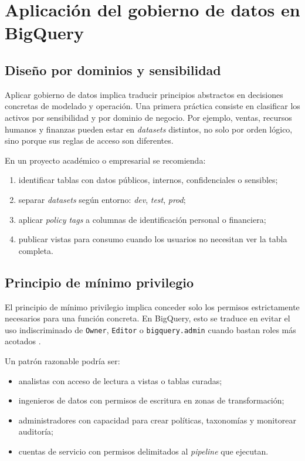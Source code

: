 \documentclass[12pt]{article}
\begin{document}
\section{Aplicación del gobierno de datos en BigQuery}
\subsection{Diseño por dominios y sensibilidad}
Aplicar gobierno de datos implica traducir principios abstractos en decisiones concretas de modelado y operación. Una primera práctica consiste en clasificar los activos por sensibilidad y por dominio de negocio. Por ejemplo, ventas, recursos humanos y finanzas pueden estar en \textit{datasets} distintos, no solo por orden lógico, sino porque sus reglas de acceso son diferentes.

En un proyecto académico o empresarial se recomienda:

\begin{enumerate}[label=\textbf{D\arabic*.}, leftmargin=*]
\item identificar tablas con datos públicos, internos, confidenciales o sensibles;
\item separar \textit{datasets} según entorno: \textit{dev}, \textit{test}, \textit{prod};
\item aplicar \textit{policy tags} a columnas de identificación personal o financiera;
\item publicar vistas para consumo cuando los usuarios no necesitan ver la tabla completa.
\end{enumerate}

\subsection{Principio de mínimo privilegio}
El principio de mínimo privilegio implica conceder solo los permisos estrictamente necesarios para una función concreta. En BigQuery, esto se traduce en evitar el uso indiscriminado de \texttt{Owner}, \texttt{Editor} o \texttt{bigquery.admin} cuando bastan roles más acotados \cite{gcp_bigquery_basic_roles,gcp_bigquery_iam}.

Un patrón razonable podría ser:

\begin{itemize}[leftmargin=*]
\item analistas con acceso de lectura a vistas o tablas curadas;
\item ingenieros de datos con permisos de escritura en zonas de transformación;
\item administradores con capacidad para crear políticas, taxonomías y monitorear auditoría;
\item cuentas de servicio con permisos delimitados al \textit{pipeline} que ejecutan.
\end{itemize}
\end{document}
